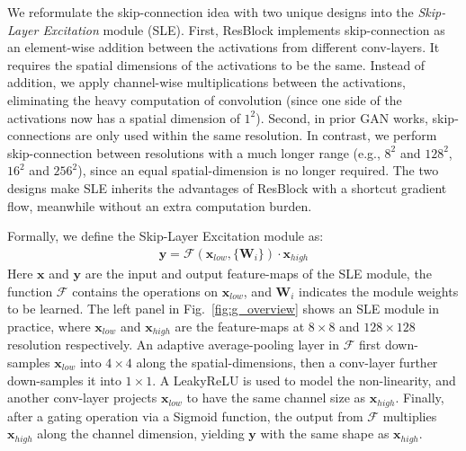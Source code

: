 \documentclass{article} \usepackage{iclr2021_conference,times}
\begin{document}
We reformulate the skip-connection idea with two unique designs into the \textit{Skip-Layer Excitation} module (SLE). First, ResBlock implements skip-connection as an element-wise addition between the activations from different conv-layers. It requires the spatial dimensions of the activations to be the same. Instead of addition, we apply channel-wise multiplications between the activations, eliminating the heavy computation of convolution (since one side of the activations now has a spatial dimension of $1^2$). Second, in prior GAN works, skip-connections are only used within the same resolution. In contrast, we perform skip-connection between resolutions with a much longer range (e.g., $8^2$ and $128^2$, $16^2$ and $256^2$), since an equal spatial-dimension is no longer required. The two designs make SLE inherits the advantages of ResBlock with a shortcut gradient flow, meanwhile without an extra computation burden.

Formally, we define the Skip-Layer Excitation module as:
\begin{align}
   \mathbf{y} = \mathcal{F}(\mathbf{x}_{low}, \{\mathbf{W}_{i}\}) \cdot \mathbf{x}_{high}
\end{align}
Here $\mathbf{x}$ and $\mathbf{y}$ are the input and output feature-maps of the SLE module, the function $\mathcal{F}$ contains the operations on $\mathbf{x}_{low}$, and $\mathbf{W}_i$ indicates the module weights to be learned. The left panel in Fig.~\ref{fig:g_overview} shows an SLE module in practice, where $\mathbf{x}_{low}$ and $\mathbf{x}_{high}$ are the feature-maps at $8\times8$ and $128\times128$ resolution respectively. An adaptive average-pooling layer in $\mathcal{F}$ first down-samples $\mathbf{x}_{low}$ into $4\times4$ along the spatial-dimensions, then a conv-layer further down-samples it into $1\times1$. A LeakyReLU is used to model the non-linearity, and another conv-layer projects $\mathbf{x}_{low}$ to have the same channel size as $\mathbf{x}_{high}$. Finally, after a gating operation via a Sigmoid function, the output from $\mathcal{F}$ multiplies $\mathbf{x}_{high}$ along the channel dimension, yielding $\mathbf{y}$ with the same shape as $\mathbf{x}_{high}$.  
\end{document}
